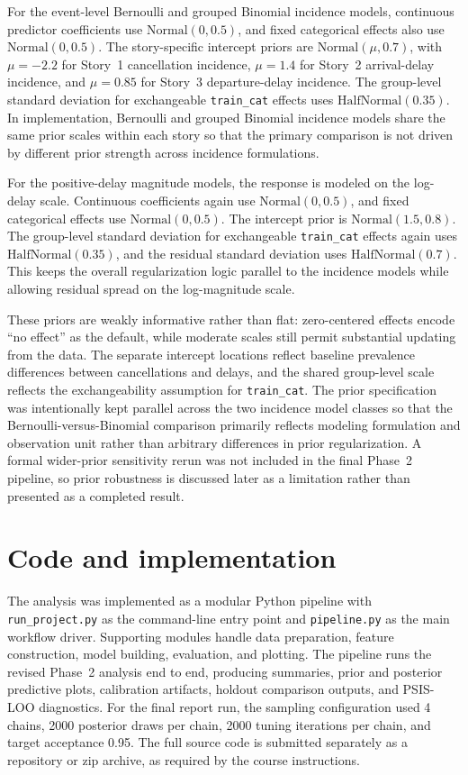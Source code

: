 \documentclass[12pt]{article}
\begin{document}
For the event-level Bernoulli and grouped Binomial incidence models, continuous predictor coefficients use \(\mathrm{Normal}(0, 0.5)\), and fixed categorical effects also use \(\mathrm{Normal}(0, 0.5)\). The story-specific intercept priors are \(\mathrm{Normal}(\mu, 0.7)\), with \(\mu=-2.2\) for Story~1 cancellation incidence, \(\mu=1.4\) for Story~2 arrival-delay incidence, and \(\mu=0.85\) for Story~3 departure-delay incidence. The group-level standard deviation for exchangeable \texttt{train\_cat} effects uses \(\mathrm{HalfNormal}(0.35)\). In implementation, Bernoulli and grouped Binomial incidence models share the same prior scales within each story so that the primary comparison is not driven by different prior strength across incidence formulations.

For the positive-delay magnitude models, the response is modeled on the log-delay scale. Continuous coefficients again use \(\mathrm{Normal}(0, 0.5)\), and fixed categorical effects use \(\mathrm{Normal}(0, 0.5)\). The intercept prior is \(\mathrm{Normal}(1.5, 0.8)\). The group-level standard deviation for exchangeable \texttt{train\_cat} effects again uses \(\mathrm{HalfNormal}(0.35)\), and the residual standard deviation uses \(\mathrm{HalfNormal}(0.7)\). This keeps the overall regularization logic parallel to the incidence models while allowing residual spread on the log-magnitude scale.

These priors are weakly informative rather than flat: zero-centered effects encode ``no effect'' as the default, while moderate scales still permit substantial updating from the data. The separate intercept locations reflect baseline prevalence differences between cancellations and delays, and the shared group-level scale reflects the exchangeability assumption for \texttt{train\_cat}. The prior specification was intentionally kept parallel across the two incidence model classes so that the Bernoulli-versus-Binomial comparison primarily reflects modeling formulation and observation unit rather than arbitrary differences in prior regularization. A formal wider-prior sensitivity rerun was not included in the final Phase~2 pipeline, so prior robustness is discussed later as a limitation rather than presented as a completed result.

\section{Code and implementation}

The analysis was implemented as a modular Python pipeline with \texttt{run\_project.py} as the command-line entry point and \texttt{pipeline.py} as the main workflow driver. Supporting modules handle data preparation, feature construction, model building, evaluation, and plotting. The pipeline runs the revised Phase~2 analysis end to end, producing summaries, prior and posterior predictive plots, calibration artifacts, holdout comparison outputs, and PSIS-LOO diagnostics. For the final report run, the sampling configuration used 4 chains, 2000 posterior draws per chain, 2000 tuning iterations per chain, and target acceptance 0.95. The full source code is submitted separately as a repository or zip archive, as required by the course instructions.
\end{document}

